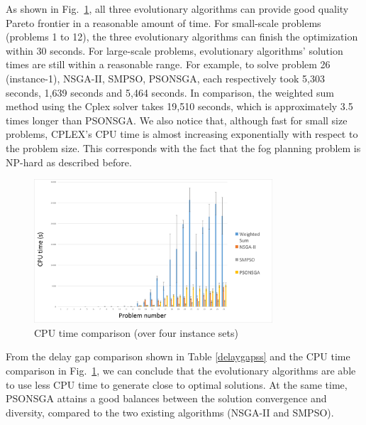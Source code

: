 \documentclass[10pt,journal,compsoc]{IEEEtran}
\newcommand{\Fig}[1]{Fig.~\ref{#1}}
\begin{document}
As shown in \Fig{cputimeover4}, all three evolutionary algorithms can provide good quality Pareto frontier in a reasonable amount of time. For small-scale problems (problems 1 to 12), the three evolutionary algorithms can finish the optimization within 30 seconds. For large-scale problems, evolutionary algorithms' solution times are still within a reasonable range. For example, to solve problem 26 (instance-1), NSGA-II, SMPSO, PSONSGA, each respectively took 5,303 seconds, 1,639 seconds and 5,464 seconds. In comparison, the weighted sum method using the Cplex solver takes 19,510 seconds, which is approximately 3.5 times longer than PSONSGA. We also notice that, although fast for small size problems, CPLEX's CPU time is almost increasing exponentially with respect to the problem size. This corresponds with the fact that the fog planning problem is NP-hard as described before.

\begin{figure}[ht]
\centerline{\includegraphics[page=1,width=3.5in]{cputimeover4}}
\caption{CPU time comparison (over four instance sets)} 
\label{cputimeover4}
\end{figure}


From the delay gap comparison shown in Table \ref{delaygapss} and the CPU time comparison in \Fig{cputimeover4}, we can conclude that the evolutionary algorithms are able to use less CPU time to generate close to optimal solutions. At the same time, PSONSGA attains a good balances between the solution convergence and diversity, compared to the two existing algorithms (NSGA-II and SMPSO).
\end{document}
